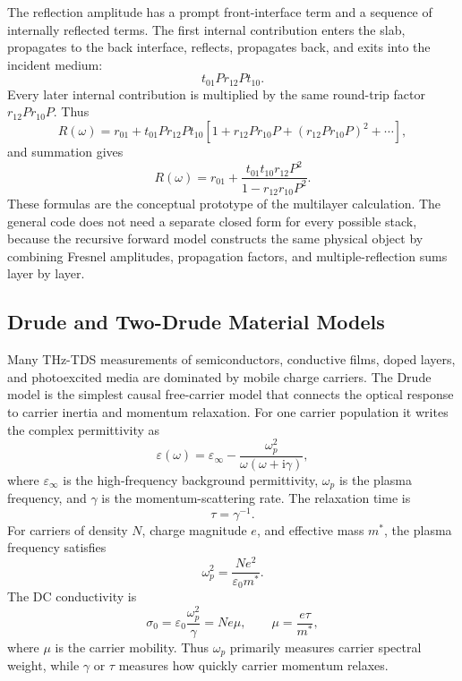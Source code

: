 \documentclass[11pt]{article}
\newcommand{\eps}{\varepsilon}
\newcommand{\epsinf}{\varepsilon_{\infty}}
\newcommand{\ii}{\mathrm{i}}
\begin{document}
The reflection amplitude has a prompt front-interface term and a sequence of internally reflected terms. The first internal contribution enters the slab, propagates to the back interface, reflects, propagates back, and exits into the incident medium:
\begin{equation}
  t_{01}Pr_{12}Pt_{10}.
  \label{eq:first_internal_reflection}
\end{equation}
Every later internal contribution is multiplied by the same round-trip factor \(r_{12}Pr_{10}P\). Thus
\begin{equation}
  R(\omega)
  =
  r_{01}
  +
  t_{01}Pr_{12}Pt_{10}
  \left[
    1+
    r_{12}Pr_{10}P+
    \left(r_{12}Pr_{10}P\right)^2+
    \cdots
  \right],
  \label{eq:fp_reflection_series}
\end{equation}
and summation gives
\begin{equation}
  R(\omega)
  =
  r_{01}
  +
  \frac{
    t_{01}t_{10}r_{12}P^2
  }{
    1-r_{12}r_{10}P^2
  } .
  \label{eq:airy_reflection}
\end{equation}
These formulas are the conceptual prototype of the multilayer calculation. The general code does not need a separate closed form for every possible stack, because the recursive forward model constructs the same physical object by combining Fresnel amplitudes, propagation factors, and multiple-reflection sums layer by layer.

\subsection{Drude and Two-Drude Material Models}

Many THz-TDS measurements of semiconductors, conductive films, doped layers, and photoexcited media are dominated by mobile charge carriers. The Drude model is the simplest causal free-carrier model that connects the optical response to carrier inertia and momentum relaxation. For one carrier population it writes the complex permittivity as
\begin{equation}
  \eps(\omega)
  =
  \epsinf
  -
  \frac{\omega_p^2}{\omega(\omega+\ii\gamma)} ,
  \label{eq:drude_permittivity}
\end{equation}
where \(\epsinf\) is the high-frequency background permittivity, \(\omega_p\) is the plasma frequency, and \(\gamma\) is the momentum-scattering rate. The relaxation time is
\begin{equation}
  \tau=\gamma^{-1}.
  \label{eq:tau_gamma}
\end{equation}
For carriers of density \(N\), charge magnitude \(e\), and effective mass \(m^\ast\), the plasma frequency satisfies
\begin{equation}
  \omega_p^2=\frac{Ne^2}{\varepsilon_0 m^\ast}.
  \label{eq:plasma_frequency}
\end{equation}
The DC conductivity is
\begin{equation}
  \sigma_0
  =
  \varepsilon_0\frac{\omega_p^2}{\gamma}
  =
  Ne\mu ,
  \qquad
  \mu=\frac{e\tau}{m^\ast},
  \label{eq:dc_conductivity_mobility}
\end{equation}
where \(\mu\) is the carrier mobility. Thus \(\omega_p\) primarily measures carrier spectral weight, while \(\gamma\) or \(\tau\) measures how quickly carrier momentum relaxes.
\end{document}
